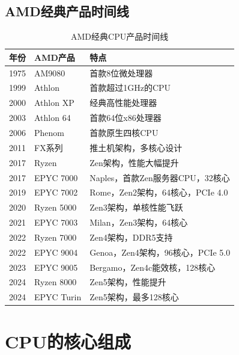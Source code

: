 \documentclass[12pt,UTF8]{ctexbook}
\begin{document}
\section{AMD经典产品时间线}

\begin{table}[H]
    \centering
    \begin{tabular}{|p{2cm}|p{5cm}|p{5cm}|}
        \hline
        \textbf{年份} & \textbf{AMD产品} & \textbf{特点} \\
        \hline
        1975 & AM9080 & 首款8位微处理器 \\
        \hline
        1999 & Athlon & 首款超过1GHz的CPU \\
        \hline
        2000 & Athlon XP & 经典高性能处理器 \\
        \hline
        2003 & Athlon 64 & 首款64位x86处理器 \\
        \hline
        2006 & Phenom & 首款原生四核CPU \\
        \hline
        2011 & FX系列 & 推土机架构，多核心设计 \\
        \hline
        2017 & Ryzen & Zen架构，性能大幅提升 \\
        \hline
        2017 & EPYC 7000 & Naples，首款Zen服务器CPU，32核心 \\
        \hline
        2019 & EPYC 7002 & Rome，Zen2架构，64核心，PCIe 4.0 \\
        \hline
        2020 & Ryzen 5000 & Zen3架构，单核性能飞跃 \\
        \hline
        2021 & EPYC 7003 & Milan，Zen3架构，64核心 \\
        \hline
        2022 & Ryzen 7000 & Zen4架构，DDR5支持 \\
        \hline
        2022 & EPYC 9004 & Genoa，Zen4架构，96核心，PCIe 5.0 \\
        \hline
        2023 & EPYC 9005 & Bergamo，Zen4c能效核，128核心 \\
        \hline
        2024 & Ryzen 8000 & Zen5架构，性能提升 \\
        \hline
        2024 & EPYC Turin & Zen5架构，最多128核心 \\
        \hline
    \end{tabular}
    \caption{AMD经典CPU产品时间线}
    \label{tab:amd_history}
\end{table}

\chapter{CPU的核心组成}
\end{document}
